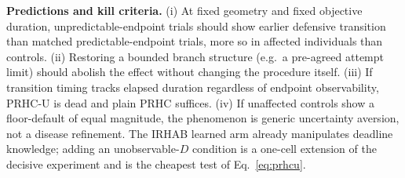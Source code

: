 \documentclass[9pt,twocolumn]{article}
\begin{document}
\textbf{Predictions and kill criteria.} (i) At fixed geometry and fixed objective duration, unpredictable-endpoint trials should show earlier defensive transition than matched predictable-endpoint trials, more so in affected individuals than controls. (ii) Restoring a bounded branch structure (e.g.\ a pre-agreed attempt limit) should abolish the effect without changing the procedure itself. (iii) If transition timing tracks elapsed duration regardless of endpoint observability, PRHC-U is dead and plain PRHC suffices. (iv) If unaffected controls show a floor-default of equal magnitude, the phenomenon is generic uncertainty aversion, not a disease refinement. The IRHAB learned arm already manipulates deadline knowledge; adding an unobservable-$D$ condition is a one-cell extension of the decisive experiment and is the cheapest test of Eq.~\ref{eq:prhcu}.
\end{document}
